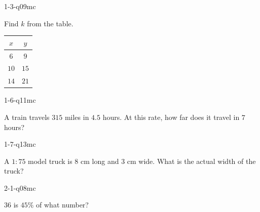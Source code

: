 
\begin{practiceQuestion}{1-3-q09}{mc}
\begin{questionText}
Find $k$ from the table.

\begin{center}
\begin{tabular}{|c|c|}
\hline $x$ & $y$ \\ \hline $6$ & $9$ \\ $10$ & $15$ \\ $14$ & $21$ \\ \hline
\end{tabular}
\end{center}
\end{questionText}
\end{practiceQuestion}

\begin{practiceQuestion}{1-6-q11}{mc}
\begin{questionText}
A train travels $315$ miles in $4.5$ hours. At this rate, how far does it travel in $7$ hours?
\end{questionText}
\end{practiceQuestion}

\begin{practiceQuestion}{1-7-q13}{mc}
\begin{questionText}
A $1 : 75$ model truck is $8$ cm long and $3$ cm wide. What is the actual width of the truck?
\end{questionText}
\end{practiceQuestion}

\begin{practiceQuestion}{2-1-q08}{mc}
\begin{questionText}
$36$ is $45\%$ of what number?
\end{questionText}
\end{practiceQuestion}

